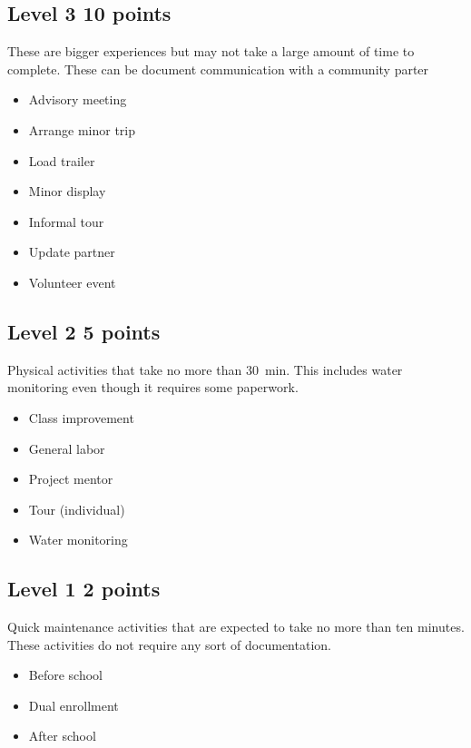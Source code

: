 \documentclass[letterpaper,10pt]{memoir}
\begin{document}
{\subsection*{Level 3 \hfill 10 points}

	These are bigger experiences but may not take a large amount of time to complete. These can be document communication with a community parter

	\begin{multicols}{3}\begin{itemize}[label=$-$,itemsep=0mm]
	\item Advisory meeting
	\item Arrange minor trip
	\item Load trailer
	\item Minor display
	\item Informal tour
	\item Update partner
	\item Volunteer event
	\end{itemize}\end{multicols}

\subsection*{Level 2 \hfill 5 points}

	Physical activities that take no more than \SI{30}{min}. This includes water monitoring even though it requires some paperwork.

	\begin{multicols}{3}\begin{itemize}[label=$-$,itemsep=0mm]
	\item Class improvement
	\item General labor
	\item Project mentor
	\item Tour (individual)
	\item Water monitoring
	\end{itemize}\end{multicols}

\subsection*{Level 1 \hfill 2 points}

	Quick maintenance activities that are expected to take no more than ten minutes. These activities do not require any sort of documentation.

	\begin{multicols}{3}\begin{itemize}[label=$-$,itemsep=0mm]
	\item Before school
	\item Dual enrollment
	\item After school
	\end{itemize}\end{multicols}

}
\end{document}
